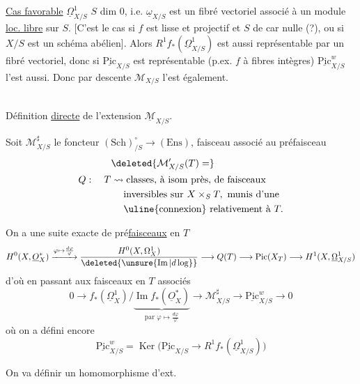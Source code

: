 \uline{Cas favorable} $\underline{\Omega}^1_{X/S}$  $S$  dim $0$, i.e. $\underline{\omega}_{X/S}$ est un fibré vectoriel associé à un module \uline{loc. libre} sur $S$. [C'est le cas si $f$ est lisse et projectif et $S$ de car nulle (?), ou si $X/S$ est un schéma abélien]. Alors $R^1 f_*(\underline{\Omega}^1_{X/S})$ est aussi représentable par un fibré vectoriel, donc si $\underline{\mathrm{Pic}}_{X/S}$ est représentable (p.ex. $f$ à fibres  intègres) $\underline{\mathrm{Pic}}^w_{X/S}$ l'est aussi. Donc par descente $\mathcal M_{X/S}$ l'est également.

\\

\noindent Définition \uline{directe} de l'extension $\underline{\mathcal M}_{X/S}$.

Soit $\mathcal M^\sharp_{X/S}$ le foncteur $(\mathrm{Sch})_{/S}^{\circ}\longrightarrow(\mathrm{Ens})$, faisceau  associé au préfaisceau
\[
\begin{aligned}
 &\deleted{\mathcal M'_{X/S}(T)=}\\
 Q:\quad T&\rightsquigarrow \text{classes, à isom près, de faisceaux}\\
 &\phantom{\rightsquigarrow{}}\text{inversibles sur }X\times_S T,\text{ munis d'une}\\
 &\phantom{\rightsquigarrow{}}\text{\uline{connexion} relativement à }T.
\end{aligned}
\]

  On a une suite exacte de pré\uline{faisceaux} en $T$
\[
 H^0(X,\underline O_X^*)\xrightarrow{\varphi\mapsto\frac{d\varphi}{\varphi}}
 \frac{H^0(X,\Omega^1_X)}{\deleted{\unsure{\operatorname{Im}|d\log}}}
 \longrightarrow Q(T)\longrightarrow\mathrm{Pic}(X_T)\longrightarrow H^1(X,\underline\Omega^1_{X/S})
\]
d'où en passant aux faisceaux en $T$ associés
\[
 0\longrightarrow f_*(\underline\Omega^1_X)/\underbrace{\operatorname{Im}f_*(\underline O_X^*)}_{\text{par }\varphi\mapsto\frac{d\varphi}{\varphi}}
 \longrightarrow\mathcal M^\sharp_{X/S}\longrightarrow\underline{\mathrm{Pic}}^{w}_{X/S}\longrightarrow0
\]
où on a défini encore
\[
 \underline{\mathrm{Pic}}^w_{X/S}=\operatorname{Ker}\bigl(\underline{\mathrm{Pic}}_{X/S}\longrightarrow R^1 f_*(\underline\Omega^1_{X/S})\bigr)
\]

On va définir un homomorphisme d'ext.

